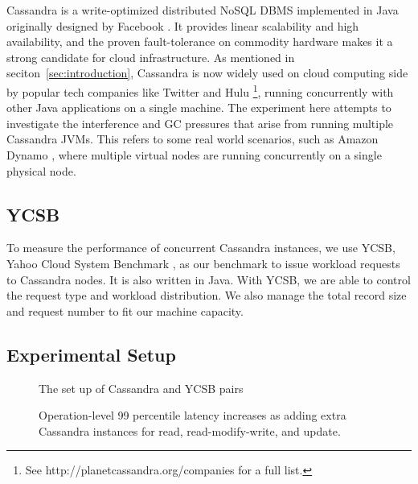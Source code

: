 \documentclass{sig-alternate}
\begin{document}
Cassandra is a write-optimized distributed NoSQL DBMS implemented in Java originally designed by Facebook \cite{lakshman2010cassandra}. It provides linear scalability and high availability, and the proven fault-tolerance on commodity hardware makes it a strong candidate for cloud infrastructure. As mentioned in seciton~\ref{sec:introduction}, Cassandra is now widely used on cloud computing side by popular tech companies like Twitter and Hulu \footnote{See http://planetcassandra.org/companies for a full list.}, running concurrently with other Java applications on a single machine. The experiment here attempts to investigate the interference and GC pressures that arise from running multiple Cassandra JVMs. This refers to some real world scenarios, such as Amazon Dynamo \cite{hastorun2007dynamo}, where multiple virtual nodes are running concurrently on a single physical node.

\subsection{YCSB}
To measure the performance of concurrent Cassandra instances, we use YCSB, Yahoo Cloud System Benchmark \cite{cooper2010benchmarking}, as our benchmark to issue workload requests to Cassandra nodes. It is also written in Java. With YCSB, we are able to control the request type and workload distribution. We also manage the total record size and request number to fit our machine capacity.

\subsection{Experimental Setup}
\begin{figure}
\centering
{}
\caption{The set up of Cassandra and YCSB pairs}
\label{fig:cassandrasetup}
\end{figure}

\begin{figure*}

\centering
{}
\caption{Operation-level 99 percentile latency increases as adding extra Cassandra instances for read, read-modify-write, and update.}
\label{fig:cassandraresults}
\end{figure*}
\end{document}
